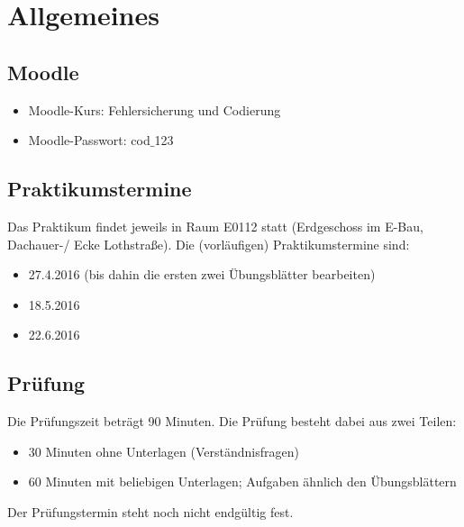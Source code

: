 \chapter{Allgemeines}

\section{Moodle}

\begin{itemize}
	\item Moodle-Kurs: Fehlersicherung und Codierung
	\item Moodle-Passwort: cod$\_$123
\end{itemize}

\section{Praktikumstermine}

Das Praktikum findet jeweils in Raum E0112 statt (Erdgeschoss im E-Bau, Dachauer-/ Ecke Lothstraße). Die (vorläufigen) Praktikumstermine sind:
\begin{itemize}
	\item 27.4.2016 (bis dahin die ersten zwei Übungsblätter bearbeiten)
	\item 18.5.2016
	\item 22.6.2016
\end{itemize}

\section{Prüfung}

Die Prüfungszeit beträgt 90 Minuten. Die Prüfung besteht dabei aus zwei Teilen:
\begin{itemize}
	\item 30 Minuten ohne Unterlagen (Verständnisfragen)
	\item 60 Minuten mit beliebigen Unterlagen; Aufgaben ähnlich den Übungsblättern
\end{itemize}
Der Prüfungstermin steht noch nicht endgültig fest.